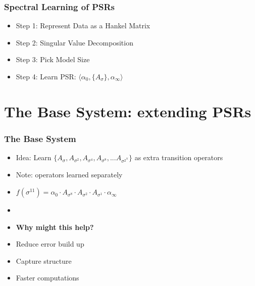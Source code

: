 \documentclass{beamer}
\begin{document}

\begin{frame}
\frametitle{Spectral Learning of PSRs}

\begin{itemize}
\item[] Step 1: Represent Data as a Hankel Matrix
\item[] Step 2: Singular Value Decomposition
\item[] Step 3: Pick Model Size
\item[] Step 4: Learn PSR: $\langle \alpha_0, \{A_\sigma\},\alpha_\infty \rangle$ 
\end{itemize}

\end{frame}

\section{The Base System: extending PSRs}

\begin{frame}
\frametitle{The Base System}
\begin{itemize}

\item Idea: Learn $\{A_{\sigma}, A_{\sigma^2}, A_{\sigma^4}, A_{\sigma^8}, ... A_{\sigma^{2^N}}\}$ as extra transition operators
\item[] Note: operators learned separately

\item[] $f(\sigma^{11}) = \alpha_0 \cdot A_{\sigma^8} \cdot A_{\sigma^2} \cdot A_{\sigma^1} \cdot \alpha_\infty$
\item[]

\item \textbf{Why might this help?}
\item[] Reduce error build up
\item[] Capture structure
\item[] Faster computations

\end{itemize}
\end{frame}
\end{document}
